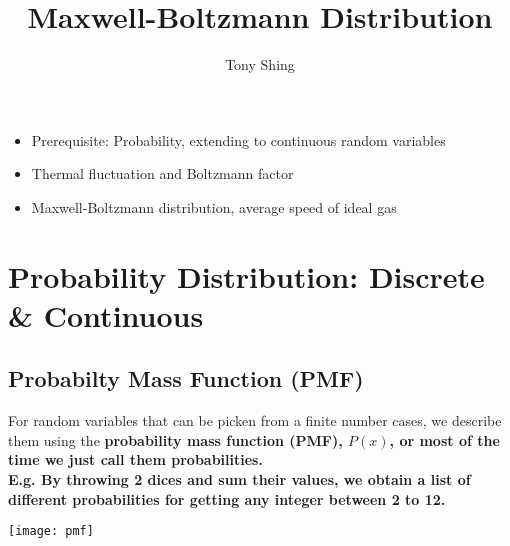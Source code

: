 \documentclass[class=article, crop=false, 12pt]{standalone}
\author{Tony Shing}
\title{Maxwell-Boltzmann Distribution}
\begin{document}
\maketitle


\begin{overview}
    \begin{itemize}
        \item Prerequisite: Probability, extending to continuous random variables
        \item Thermal fluctuation and Boltzmann factor
        \item Maxwell-Boltzmann distribution, average speed of ideal gas
    \end{itemize}

\end{overview}


\section{Probability Distribution: Discrete \& Continuous}

\subsection{Probabilty Mass Function (PMF)}

For random variables that can be picken from a finite number cases,
we describe them using the \bf{probability mass function} (PMF), $P(x)$,
or most of the time we just call them probabilities.\\

E.g. By throwing 2 dices and sum their values, 
we obtain a list of different probabilities for getting any integer between 2 to 12.

\begin{center}
    \begin{minipage}{0.55\linewidth}
        \centering
        \texttt{[image: pmf]}
    \end{minipage}
\end{center}
\end{document}

